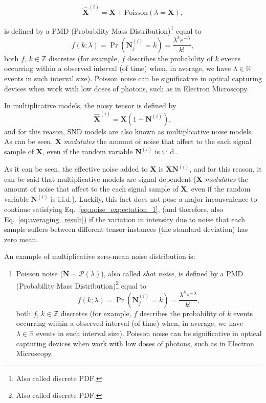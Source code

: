 \documentclass{article}
\begin{document}
  
  \begin{equation}
    \hat{\mathbf X}^{(i)} = {\mathbf X} + \mathrm{Poisson}(\lambda={\mathbf X}),
    \label{eq:PN}
  \end{equation}


  is defined by a PMD (Probability Mass
  Distribution)\footnote{Also called discrete PDF.} equal to
  \begin{equation}
    f(k; \lambda) = \Pr({\mathbf N}^{(i)}_j{=}k) = \frac{\lambda^k e^{-\lambda}}{k!},
  \end{equation}
  both $f$, $k\in\mathbb{Z}$ discretes (for example, $f$ describes the
  probability of $k$ events occurring within a observed interval (of
  time) when, in average, we have $\lambda\in\mathbb{R}$ events in
  such interval size). Poisson noise can be significative in optical
  capturing devices when work with low doses of photons, such as in
  Electron Microscopy.

In multiplicative models, the noisy tensor is defined by
\begin{equation}
  \hat{\mathbf X}^{(i)} = {\mathbf X} (1 + {\mathbf N}^{(i)}),
  \label{eq:multiplicative_noisy_model}
\end{equation}
and for this reason, SND models are also known as multiplicative noise
models. As can be seen, ${\mathbf X}$ \emph{modulates} the amount of
noise that affect to the each signal sample of ${\mathbf X}$, even if
the random variable ${\mathbf N}^{(i)}$ is i.i.d..

As it can be seen, the effective noise added to ${\mathbf X}$ is
${\mathbf X}{\mathbf N}^{(i)}$, and for this reason, it can be said
that multiplicative models are signal dependent (${\mathbf X}$
\emph{modulates} the amount of noise that affect to the each signal
sample of ${\mathbf X}$, even if the random variable
${\mathbf N}^{(i)}$ is i.i.d.). Luckily, this fact does not pose a
major inconvenience to continue satisfying
Eq.~\ref{eq:noise_expectation_1}, (and therefore, also
Eq.~\ref{eq:averaging_result}) if the variation in intensity due to
noise that each sample suffers between different tensor instances (the
standard deviation) has zero mean.

An example of multiplicative zero-mean noise distribution is:

\begin{enumerate}
\item Poisson noise ($\mathbf{N}\sim\mathcal{P}(\lambda)$), also
  called \emph{shot noise}, is defined by a PMD (Probability Mass
  Distribution)\footnote{Also called discrete PDF.} equal to
  \begin{equation}
    f(k; \lambda) = \Pr({\mathbf N}^{(i)}_j{=}k) = \frac{\lambda^k e^{-\lambda}}{k!},
  \end{equation}
  both $f$, $k\in\mathbb{Z}$ discretes (for example, $f$ describes the
  probability of $k$ events occurring within a observed interval (of
  time) when, in average, we have $\lambda\in\mathbb{R}$ events in
  such interval size). Poisson noise can be significative in optical
  capturing devices when work with low doses of photons, such as in
  Electron Microscopy.
\end{enumerate}
\end{document}
